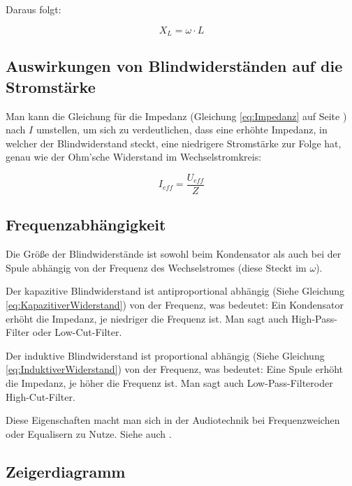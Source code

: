 Daraus folgt:

\begin{equation}	\label{eq:InduktiverWiderstand}
	X_L = \omega \cdot  L
\end{equation}


\subsection{Auswirkungen von Blindwiderständen auf die Stromstärke} \label{subsec:AuswirkungenWiderstand}

Man kann die Gleichung für die Impedanz (Gleichung \ref{eq:Impedanz} auf Seite \pageref{eq:Impedanz}) nach $I$ umstellen, um sich zu verdeutlichen, dass eine erhöhte Impedanz, in welcher der Blindwiderstand steckt, eine niedrigere Stromstärke zur Folge hat, genau wie der Ohm'sche Widerstand im Wechselstromkreis:

\begin{equation}	\label{eq:ImitZ}
	I_{eff}=\frac{U_{eff}}{Z}
\end{equation}


\subsection{Frequenzabhängigkeit}	\label{subsec:Frequenzabhaengigkeit}

Die Größe der Blindwiderstände ist sowohl beim Kondensator als auch bei der Spule abhängig von der Frequenz des Wechselstromes (diese Steckt im $\omega$).

Der kapazitive Blindwiderstand ist antiproportional abhängig (Siehe Gleichung \ref{eq:KapazitiverWiderstand}) von der Frequenz, was bedeutet: \glqq Ein Kondensator erhöht die Impedanz, je niedriger die Frequenz ist.\grqq{} Man sagt auch \glqq High-Pass-Filter\grqq{} oder \glqq Low-Cut-Filter\grqq .

Der induktive Blindwiderstand ist proportional abhängig (Siehe Gleichung \ref{eq:InduktiverWiderstand}) von der Frequenz, was bedeutet: \glqq Eine Spule erhöht die Impedanz, je höher die Frequenz ist.\grqq{} Man sagt auch \glqq Low-Pass-Filter\grqq oder \glqq High-Cut-Filter\grqq .

Diese Eigenschaften macht man sich in der Audiotechnik bei Frequenzweichen oder Equalisern zu Nutze. Siehe auch .



\subsection{Zeigerdiagramm}	\label{subsec:WiderstaendeZeigerdiagram}

